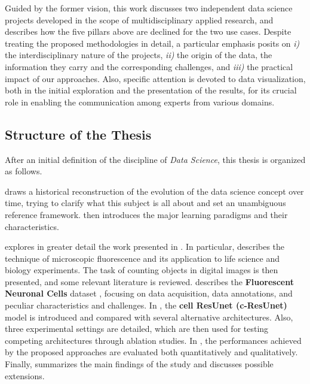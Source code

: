Guided by the former vision, this work discusses two independent data science projects developed in the scope of multidisciplinary applied research, and describes how the five pillars above are declined for the two use cases.
Despite treating the proposed methodologies in detail, a particular emphasis posits on \textit{i)} the interdisciplinary nature of the projects, \textit{ii)} the origin of the data, the information they carry and the corresponding challenges, and \textit{iii)} the practical impact of our approaches.
Also, specific attention is devoted to data visualization, both in the initial exploration and the presentation of the results, for its crucial role in enabling the communication among experts from various domains.

\subsection*{Structure of the Thesis}

After an initial definition of the discipline of \emph{Data Science}, this thesis is organized as follows.

 draws a historical reconstruction of the evolution of the data science concept over time, trying to clarify what this subject is all about and set an unambiguous reference framework. 
 then introduces the major learning paradigms and their characteristics.

 explores in greater detail the work presented in . In particular,  describes the technique of microscopic fluorescence and its application to life science and biology experiments. The task of counting objects in digital images is then presented, and some relevant literature is reviewed.
 describes the \textbf{Fluorescent Neuronal Cells} dataset \cite{clissa2021fluocells}, focusing on data acquisition, data annotations, and peculiar characteristics and challenges. 
In , the \textbf{cell ResUnet (c-ResUnet)} \cite{morelli2021cresunet} model is introduced and compared with several alternative architectures. Also, three experimental settings are detailed, which are then used for testing competing architectures through ablation studies.
In , the performances achieved by the proposed approaches are evaluated both quantitatively and qualitatively.
Finally,  summarizes the main findings of the study and discusses possible extensions.

